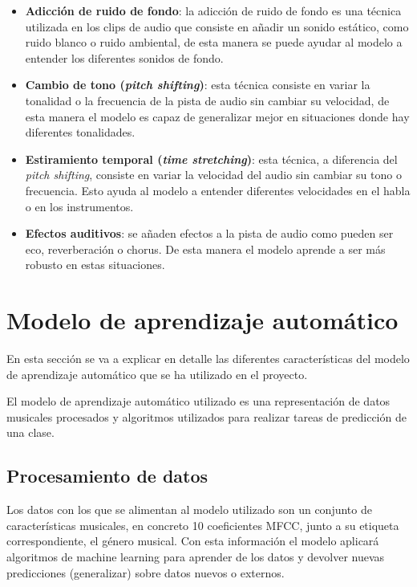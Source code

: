 \begin{itemize}
\tightlist

\item \textbf{Adicción de ruido de fondo}: la adicción de ruido de fondo es una técnica utilizada en los clips de audio que consiste en añadir un sonido estático, como ruido blanco o ruido ambiental, de esta manera se puede ayudar al modelo a entender los diferentes sonidos de fondo.

\item \textbf{Cambio de tono (\textit{pitch shifting})}: esta técnica consiste en variar la tonalidad o la frecuencia de la pista de audio sin cambiar su velocidad, de esta manera el modelo es capaz de generalizar mejor en situaciones donde hay diferentes tonalidades.

\item \textbf{Estiramiento temporal (\textit{time stretching})}: esta técnica, a diferencia del \textit{pitch shifting}, consiste en variar la velocidad del audio sin cambiar su tono o frecuencia. Esto ayuda al modelo a entender diferentes velocidades en el habla o en los instrumentos.

\item \textbf{Efectos auditivos}: se añaden efectos a la pista de audio como pueden ser eco, reverberación o chorus. De esta manera el modelo aprende a ser más robusto en estas situaciones.

\end{itemize}

\newpage

\section{Modelo de aprendizaje automático}

En esta sección se va a explicar en detalle las diferentes características del modelo de aprendizaje automático que se ha utilizado en el proyecto.

El modelo de aprendizaje automático utilizado es una representación de datos musicales procesados y algoritmos utilizados para realizar tareas de predicción de una clase.

\subsection{Procesamiento de datos}

Los datos con los que se alimentan al modelo utilizado son un conjunto de características musicales, en concreto 10 coeficientes MFCC, junto a su etiqueta correspondiente, el género musical. Con esta información el modelo aplicará algoritmos de machine learning para aprender de los datos y devolver nuevas predicciones
(generalizar) sobre datos nuevos o externos.

